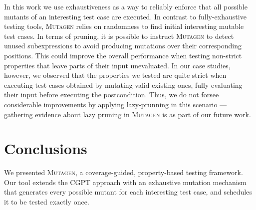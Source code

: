 \documentclass[sigconf, anonymous, review]{acmart}
\newcommand{\mutagen}{\textsc{Mutagen}\xspace}
\begin{document}
In this work we use exhaustiveness as a way to reliably enforce that all
possible mutants of an interesting test case are executed.
%
In contrast to fully-exhaustive testing tools, \mutagen relies on randomness to
find initial interesting mutable test cases.
%
In terms of pruning, it is possible to instruct \mutagen to detect unused
subexpressions to avoid producing mutations over their corresponding positions.
%
This could improve the overall performance when testing non-strict properties
that leave parts of their input unevaluated.
%
In our case studies, however, we observed that the properties we tested
are quite strict when executing test cases obtained by mutating valid existing ones,
fully evaluating their input before executing the postcondition.
%
Thus, we do not forsee considerable improvements by applying lazy-prunning in
this scenario --- gathering evidence about lazy pruning in \mutagen is as part
of our future work.




\section{Conclusions}
\label{sec:conclusions}

We presented \mutagen, a coverage-guided, property-based testing framework.
%
%
Our tool extends the CGPT approach
with an exhaustive mutation mechanism that generates every possible mutant for
each interesting test case, and schedules it to be tested exactly once.


\end{document}
